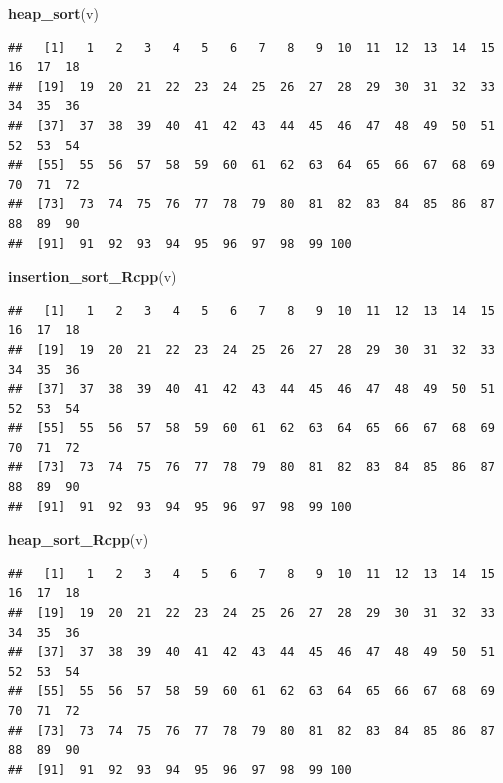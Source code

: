 \documentclass[
]{article}
\newenvironment{Shaded}{\begin{snugshade}}{\end{snugshade}}
\newcommand{\FunctionTok}[1]{\textcolor[rgb]{0.13,0.29,0.53}{\textbf{#1}}}
\newcommand{\NormalTok}[1]{#1}
\begin{document}
\begin{Shaded}
\begin{Highlighting}[]
\FunctionTok{heap\_sort}\NormalTok{(v)}
\end{Highlighting}
\end{Shaded}

\begin{verbatim}
##   [1]   1   2   3   4   5   6   7   8   9  10  11  12  13  14  15  16  17  18
##  [19]  19  20  21  22  23  24  25  26  27  28  29  30  31  32  33  34  35  36
##  [37]  37  38  39  40  41  42  43  44  45  46  47  48  49  50  51  52  53  54
##  [55]  55  56  57  58  59  60  61  62  63  64  65  66  67  68  69  70  71  72
##  [73]  73  74  75  76  77  78  79  80  81  82  83  84  85  86  87  88  89  90
##  [91]  91  92  93  94  95  96  97  98  99 100
\end{verbatim}

\begin{Shaded}
\begin{Highlighting}[]
\FunctionTok{insertion\_sort\_Rcpp}\NormalTok{(v)}
\end{Highlighting}
\end{Shaded}

\begin{verbatim}
##   [1]   1   2   3   4   5   6   7   8   9  10  11  12  13  14  15  16  17  18
##  [19]  19  20  21  22  23  24  25  26  27  28  29  30  31  32  33  34  35  36
##  [37]  37  38  39  40  41  42  43  44  45  46  47  48  49  50  51  52  53  54
##  [55]  55  56  57  58  59  60  61  62  63  64  65  66  67  68  69  70  71  72
##  [73]  73  74  75  76  77  78  79  80  81  82  83  84  85  86  87  88  89  90
##  [91]  91  92  93  94  95  96  97  98  99 100
\end{verbatim}

\begin{Shaded}
\begin{Highlighting}[]
\FunctionTok{heap\_sort\_Rcpp}\NormalTok{(v)}
\end{Highlighting}
\end{Shaded}

\begin{verbatim}
##   [1]   1   2   3   4   5   6   7   8   9  10  11  12  13  14  15  16  17  18
##  [19]  19  20  21  22  23  24  25  26  27  28  29  30  31  32  33  34  35  36
##  [37]  37  38  39  40  41  42  43  44  45  46  47  48  49  50  51  52  53  54
##  [55]  55  56  57  58  59  60  61  62  63  64  65  66  67  68  69  70  71  72
##  [73]  73  74  75  76  77  78  79  80  81  82  83  84  85  86  87  88  89  90
##  [91]  91  92  93  94  95  96  97  98  99 100
\end{verbatim}
\end{document}
